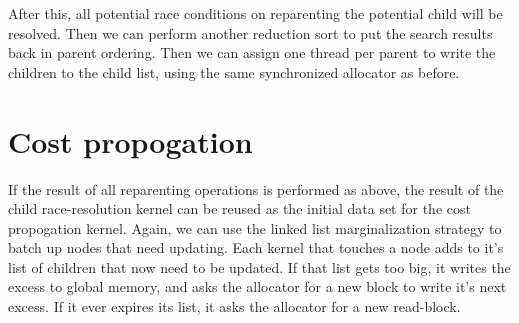 After this, all potential race conditions on reparenting the potential child will be resolved. Then we can perform another reduction sort to put the search results back in parent ordering. Then we can assign one thread per parent to write the children to the child list, using the same synchronized allocator as before. 
 
\begin{figure}[H]
\begin{centering}
    \texttt{[image: \\figfile\{fig/kernel\_parent\_rotate]}}
    \caption{Parent Reduction}
\end{centering} 
\end{figure} 


\section{Cost propogation}
If the result of all reparenting operations is performed as above, the result of the child race-resolution kernel can be reused as the initial data set for the cost propogation kernel. Again, we can use the linked list marginalization strategy to batch up nodes that need updating. Each kernel that touches a node adds to it's list of children that now need to be updated. If that list gets too big, it writes the excess to global memory, and asks the allocator for a new block to write it's next excess. If it ever expires its list, it asks the allocator for a new read-block.







 